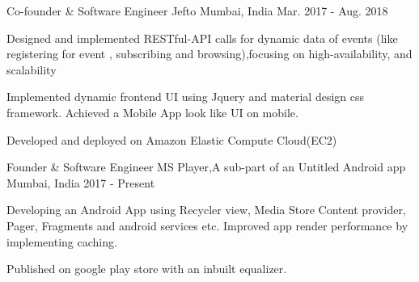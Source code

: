 

\begin{cventries}
  
  \cventry
    {Co-founder \& Software Engineer} %
    {Jefto} %
    {Mumbai, India} %
    {Mar. 2017 - Aug. 2018} %
    {
      \begin{cvitems} %
        \item {Designed and implemented RESTful-API calls for dynamic data of events (like registering for event , subscribing and browsing),focusing on high-availability, and scalability }
        \item {Implemented dynamic frontend UI using Jquery and material design css framework. Achieved a Mobile App look  like UI on mobile.   }
        \item {Developed  and deployed on Amazon Elastic Compute Cloud(EC2) }
      \end{cvitems}
    }

\end{cventries}



\begin{cventries}

  \cventry
    {Founder \& Software Engineer} %
    {MS Player,A sub-part of an Untitled Android app} %
    {Mumbai, India} %
    { 2017 - Present} %
    {
      \begin{cvitems} %
        \item {Developing an Android App using Recycler view, Media Store Content provider, Pager, Fragments and android services etc. Improved app render performance by implementing caching. }
        \item {Published on google play store with an inbuilt equalizer. }
      \end{cvitems}
    }


\end{cventries}
